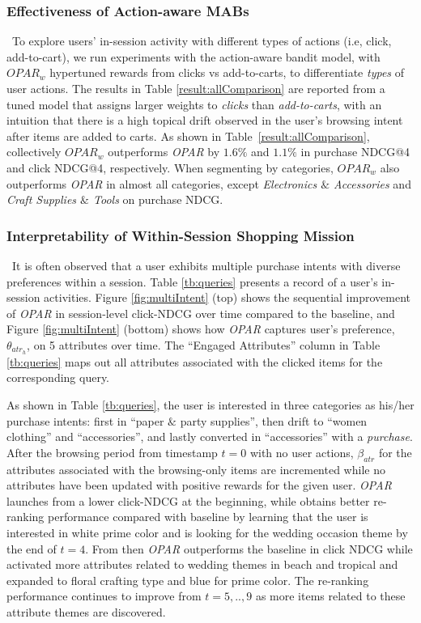 \documentclass[11pt, dvipdfmx]{article}
\begin{document}
\subsubsection{Effectiveness of Action-aware MABs}\, \label{exp3} 
To explore users' in-session activity with different types of actions (i.e, click, add-to-cart), we run experiments with the action-aware bandit model, with $\textit{OPAR}_w$ hypertuned rewards from clicks vs add-to-carts, to differentiate \textit{types} of user actions. The results in Table \ref{result:allComparison} are reported from a tuned model that assigns larger weights to \textit{clicks} than \textit{add-to-carts}, with an intuition that there is a high topical drift observed in the user's browsing intent after items are added to carts. 
As shown in Table~\ref{result:allComparison}, collectively $\textit{OPAR}_w$ outperforms \textit{OPAR} by $1.6\%$ and $1.1\%$ in purchase NDCG@4 and click NDCG@4, respectively. When segmenting by categories, $\textit{OPAR}_w$ also outperforms \textit{OPAR} in almost all categories, except \textit{Electronics $\&$ Accessories} and \textit{Craft Supplies $\&$ Tools} on purchase NDCG. 


\subsubsection{Interpretability of Within-Session Shopping Mission}\, \label{exp4} 
It is often observed that a user exhibits multiple purchase intents with diverse preferences within a session. Table \ref{tb:queries} presents a record of a user's in-session activities. Figure \ref{fig:multiIntent} (top) shows the sequential improvement of \emph{OPAR} in session-level click-NDCG over time compared to the baseline, and Figure \ref{fig:multiIntent} (bottom) shows how \emph{OPAR} captures user's preference, $\theta_{atr_h}$, on 5 attributes over time. The ``Engaged Attributes'' column in Table \ref{tb:queries} maps out all attributes associated with the clicked items for the corresponding query. 

As shown in Table \ref{tb:queries}, the user is interested in three categories as his/her purchase intents: first in ``paper $\&$ party supplies'', then drift to ``women clothing'' and ``accessories'', and lastly converted in ``accessories'' with a \textit{purchase}. After the browsing period from timestamp $t=0$ with no user actions, $\beta_{atr}$ for the attributes associated with the browsing-only items are incremented while no attributes have been updated with positive rewards for the given user. \textit{OPAR} launches from a lower click-NDCG at the beginning, while obtains better re-ranking performance compared with baseline by learning that the user is interested in white prime color and is looking for the wedding occasion theme by the end of $t=4$. From then \textit{OPAR} outperforms the baseline in click NDCG while activated more attributes related to wedding themes in beach and tropical and expanded to floral crafting type and blue for prime color. The re-ranking performance continues to improve from $t=5,..,9$ as more items related to these attribute themes are discovered.
\end{document}
